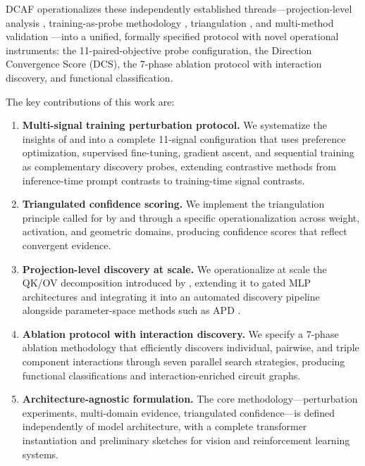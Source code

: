 \documentclass[11pt]{article}
\begin{document}
DCAF operationalizes these independently established threads---projection-level analysis \citep{elhage2021mathematical}, training-as-probe methodology \citep{prakash2024finetuning,tigges2024consistent}, triangulation \citep{long2025triangulation,sharkey2025openproblems}, and multi-method validation \citep{mondorf2025ensemble}---into a unified, formally specified protocol with novel operational instruments: the 11-paired-objective probe configuration, the Direction Convergence Score (DCS), the 7-phase ablation protocol with interaction discovery, and functional classification.

The key contributions of this work are:
\begin{enumerate}[nosep]
\item \textbf{Multi-signal training perturbation protocol.} We systematize the insights of \citet{prakash2024finetuning} and \citet{tigges2024consistent} into a complete 11-signal configuration that uses preference optimization, supervised fine-tuning, gradient ascent, and sequential training as complementary discovery probes, extending contrastive methods \citep{panickssery2024caa,arditi2024refusal} from inference-time prompt contrasts to training-time signal contrasts.

\item \textbf{Triangulated confidence scoring.} We implement the triangulation principle called for by \citet{long2025triangulation} and \citet{sharkey2025openproblems} through a specific operationalization across weight, activation, and geometric domains, producing confidence scores that reflect convergent evidence.

\item \textbf{Projection-level discovery at scale.} We operationalize at scale the QK/OV decomposition introduced by \citet{elhage2021mathematical}, extending it to gated MLP architectures and integrating it into an automated discovery pipeline alongside parameter-space methods such as APD \citep{braun2025apd}.

\item \textbf{Ablation protocol with interaction discovery.} We specify a 7-phase ablation methodology that efficiently discovers individual, pairwise, and triple component interactions through seven parallel search strategies, producing functional classifications and interaction-enriched circuit graphs.

\item \textbf{Architecture-agnostic formulation.} The core methodology---perturbation experiments, multi-domain evidence, triangulated confidence---is defined independently of model architecture, with a complete transformer instantiation and preliminary sketches for vision and reinforcement learning systems.
\end{enumerate}
\end{document}
